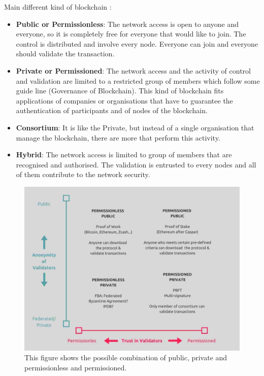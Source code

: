 \documentclass{article}
\begin{document}
    Main different kind of blockchain \cite{wiki-Blockchain, BlockchainPP}:
    \begin{itemize}
        \item \textbf{Public or Permissionless}: The network access is open to anyone and everyone, so it is completely free for everyone that would like to join. The control is distributed and involve every node. Everyone can join and everyone should validate the transaction.
        
        \item \textbf{Private or Permissioned}: The network access and the activity of control and validation are limited to a restricted group of members which follow some guide line (Governance of Blockchain). This kind of blockchain fits applications of companies or organisations that have to guarantee the authentication of participants and of nodes of the blockchain.
        
        
        \item \textbf{Consortium}: It is like the Private, but instead of a single organisation that manage the blockchain, there are more that perform this activity.
        
        \item \textbf{Hybrid}: The network access is limited to group of members that are recognised and authorised. The validation is entrusted to every nodes and all of them contribute to the network security.
    \end{itemize}
    \begin{figure}[h]
        \centering
        \includegraphics[width=0.8\linewidth]{pppp.jpg}
        \caption{This figure shows the possible combination of public, private and permissionless and permissioned. \cite{fig-pppp}}
        \label{fig:pppp}
    \end{figure}
    
\end{document}
